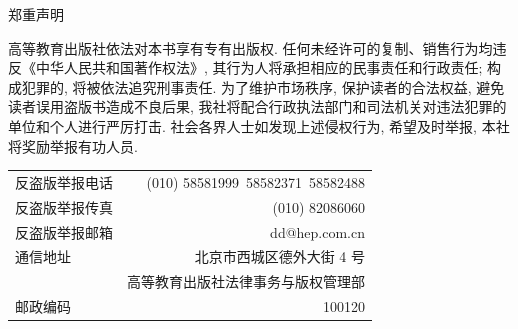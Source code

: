 \clearpage\thispagestyle{empty}
\noindent\begin{minipage}[t]{51mm}\large 郑重声明\end{minipage}\hfill
\begin{minipage}[t]{86mm}\small
高等教育出版社依法对本书享有专有出版权. 任何未经许可的复制、销售行为均违反《中华人民共和国著作权法》, 其行为人将承担相应的民事责任和行政责任; 构成犯罪的, 将被依法追究刑事责任. 为了维护市场秩序, 保护读者的合法权益, 避免读者误用盗版书造成不良后果, 我社将配合行政执法部门和司法机关对违法犯罪的单位和个人进行严厉打击. 社会各界人士如发现上述侵权行为, 希望及时举报, 本社将奖励举报有功人员.

\vspace{7mm}\fontsize{7}{10}\selectfont
\begin{tabular}{@{}p{29mm}r@{}}
反盗版举报电话 &(010) 58581999\ 58582371\ 58582488\\
反盗版举报传真 &(010) 82086060\\
反盗版举报邮箱 &dd@hep.com.cn\\
通信地址 &北京市西城区德外大街 4 号\\
 &高等教育出版社法律事务与版权管理部\\
邮政编码 &100120
\end{tabular}
\end{minipage}
